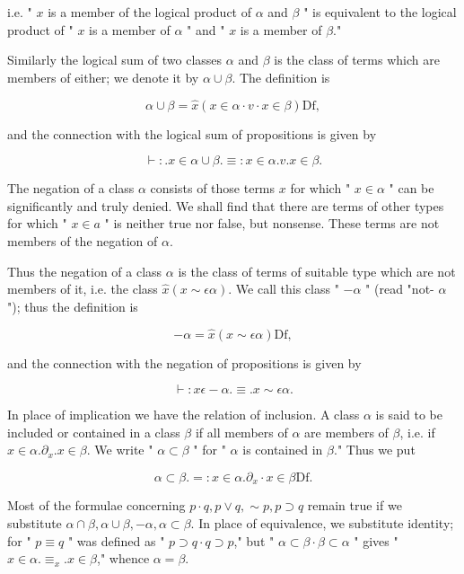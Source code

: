 \documentclass[10pt]{article}
\begin{document}
i.e. " $x$ is a member of the logical product of $\alpha$ and $\beta$ " is equivalent to the logical product of " $x$ is a member of $\alpha$ " and " $x$ is a member of $\beta$."

Similarly the logical sum of two classes $\alpha$ and $\beta$ is the class of terms which are members of either; we denote it by $\alpha \cup \beta$. The definition is

$$
\alpha \cup \beta=\hat{x}(x \in \alpha \cdot v \cdot x \in \beta) \mathrm{Df},
$$

and the connection with the logical sum of propositions is given by

$$
\vdash: . x \in \alpha \cup \beta . \equiv: x \in \alpha . v . x \in \beta .
$$

The negation of a class $\alpha$ consists of those terms $x$ for which " $x \in \alpha$ " can be significantly and truly denied. We shall find that there are terms of other types for which " $x \in a$ " is neither true nor false, but nonsense. These terms are not members of the negation of $\alpha$.

Thus the negation of a class $\alpha$ is the class of terms of suitable type which are not members of it, i.e. the class $\hat{x}(x \sim \epsilon \alpha)$. We call this class " $-\alpha$ " (read "not- $\alpha$ "); thus the definition is

$$
-\alpha=\hat{x}(x \sim \epsilon \alpha) \mathrm{Df},
$$

and the connection with the negation of propositions is given by

$$
\vdash: x \epsilon-\alpha . \equiv . x \sim \epsilon \alpha .
$$

In place of implication we have the relation of inclusion. A class $\alpha$ is said to be included or contained in a class $\beta$ if all members of $\alpha$ are members of $\beta$, i.e. if $x \in \alpha . \partial_{x} . x \in \beta$. We write " $\alpha \subset \beta$ " for " $\alpha$ is contained in $\beta$." Thus we put

$$
\alpha \subset \beta .=: x \in \alpha . \partial_{x} \cdot x \in \beta \mathrm{Df} .
$$

Most of the formulae concerning $p \cdot q, p \vee q, \sim p, p \supset q$ remain true if we substitute $\alpha \cap \beta, \alpha \cup \beta,-\alpha, \alpha \subset \beta$. In place of equivalence, we substitute identity; for " $p \equiv q$ " was defined as " $p \supset q \cdot q \supset p$," but " $\alpha \subset \beta \cdot \beta \subset \alpha$ " gives " $x \in \alpha . \equiv_{x} . x \in \beta$," whence $\alpha=\beta$.
\end{document}
